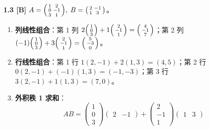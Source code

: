 \textbf{1.3 [B]}
$A = \begin{psmallmatrix}1&2\\0&-1\\3&1\end{psmallmatrix},\; B = \begin{psmallmatrix}2&-1\\1&3\end{psmallmatrix}$。
\begin{enumerate}[label=(\arabic*)]
  \item \textbf{列线性组合}：第 1 列 $2\begin{psmallmatrix}1\\0\\3\end{psmallmatrix} + 1\begin{psmallmatrix}2\\-1\\1\end{psmallmatrix} = \begin{psmallmatrix}4\\-1\\7\end{psmallmatrix}$；第 2 列 $(-1)\begin{psmallmatrix}1\\0\\3\end{psmallmatrix} + 3\begin{psmallmatrix}2\\-1\\1\end{psmallmatrix} = \begin{psmallmatrix}5\\-3\\0\end{psmallmatrix}$。
  \item \textbf{行线性组合}：第 1 行 $1(2,-1)+2(1,3)=(4,5)$；第 2 行 $0(2,-1)+(-1)(1,3)=(-1,-3)$；第 3 行 $3(2,-1)+1(1,3)=(7,0)$。
  \item \textbf{外积秩 1 求和}：
  \[
    AB = \begin{pmatrix}1\\0\\3\end{pmatrix}\begin{pmatrix}2 & -1\end{pmatrix}
       + \begin{pmatrix}2\\-1\\1\end{pmatrix}\begin{pmatrix}1 & 3\end{pmatrix}
\]
\end{enumerate}

